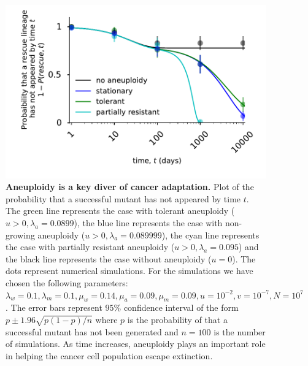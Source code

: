 \documentclass[12pt]{extarticle}
\begin{document}
\begin{figure}
\vspace*{1\baselineskip}
\includegraphics[width=1\textwidth]{Figures/ReboundProbability.pdf}
\caption{\textbf{Aneuploidy is a key diver of cancer adaptation.}
Plot of the probability that a successful mutant has not appeared by time $t$. The green line represents the case with tolerant aneuploidy ($u>0, \lambda_a=0.0899$), the blue line represents the case with non-growing aneuploidy ($u>0, \lambda_a=0.089999$), the cyan line represents the case with partially resistant aneuploidy ($u>0, \lambda_a=0.095$) and the black line represents the case without aneuploidy ($u=0$).  The  dots represent numerical simulations.  For the simulations we have chosen the following parameters: $\lambda_w=0.1,\lambda_m=0.1,\mu_w=0.14,\mu_a=0.09,\mu_m=0.09, u=10^{-2}, v=10^{-7},N=10^7$. The error bars represent $95\%$ confidence interval of the form $p\pm1.96\sqrt{p\left(1-p\right)/n}$ where $p$ is the  probability of that a successful mutant has not been generated and $n=100$ is the number of simulations. As time increases, aneuploidy plays an important role in helping the cancer cell population escape extinction.}
\label{ReboundProbability}
\end{figure}
\end{document}
